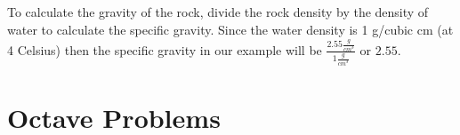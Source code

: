 \documentclass[a4paper, 10pt]{article}
\newcommand{\volumeUnit}[0]{\frac{g}{cm^{3}}}
\begin{document}
				\noindent To calculate the gravity of the rock, divide the rock density by the density of water to calculate the specific gravity. Since the water density is 1 g/cubic cm (at 4 Celsius) then the specific gravity in our example will be $\frac{2.55\volumeUnit}{1\volumeUnit}$ or $2.55$.
		\section{Octave Problems}
\end{document}
